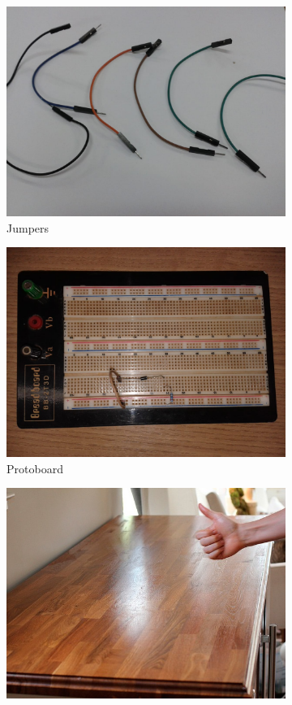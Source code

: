\documentclass[
	12pt,				%
	openright,			%
	twoside,			%
	a4paper,			%
	article,	
	english,			%
	french,				%
	spanish,			%
	brazil				%
	]{abntex2}
\begin{document}
\begin{figure}[H]
\begin{subfigure}[H]{0.3\textwidth}
		\includegraphics[width=\textwidth]{jumpers.jpeg}
		\caption{Jumpers}
	\end{subfigure}
\hfill
	\begin{subfigure}[H]{0.3\textwidth}\center
		\includegraphics[width=\textwidth]{proto.jpeg}
		\caption{Protoboard}
	\end{subfigure}
\hfill
	\begin{subfigure}[H]{0.3\textwidth}\center
		\includegraphics[trim=5cm 5cm 5cm 5cm, clip, width=\textwidth]{bancada.jpg}

\end{subfigure}
\end{figure}
\end{document}
